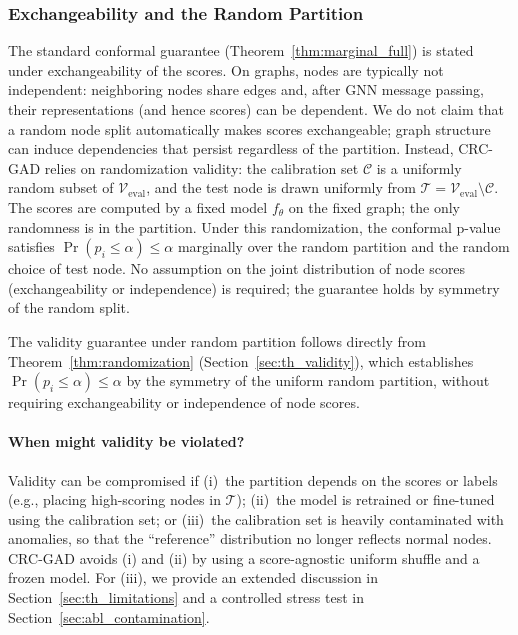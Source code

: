 \documentclass[a4paper]{cas-dc}
\theoremstyle{definition}
\begin{document}
\subsubsection{Exchangeability and the Random Partition}
\label{sec:th_exchangeability}

The standard conformal guarantee (Theorem~\ref{thm:marginal_full}) is stated under exchangeability of the scores.  On graphs, nodes are typically {not} independent: neighboring nodes share edges and, after GNN message passing, their representations (and hence scores) can be dependent.  We do {not} claim that a random node split automatically makes scores exchangeable; graph structure can induce dependencies that persist regardless of the partition. Instead, CRC-GAD relies on {randomization validity}: the calibration set $\mathcal{C}$ is a uniformly random subset of $\mathcal{V}_{\text{eval}}$, and the test node is drawn uniformly from $\mathcal{T} = \mathcal{V}_{\text{eval}} \setminus \mathcal{C}$.  The scores are computed by a {fixed} model $f_\theta$ on the {fixed} graph; the only randomness is in the partition.  Under this randomization, the conformal p-value satisfies $\Pr(p_i \leq \alpha) \leq \alpha$ {marginally} over the random partition and the random choice of test node.  No assumption on the joint distribution of node scores (exchangeability or independence) is required; the guarantee holds by symmetry of the random split.

The validity guarantee under random partition follows directly from Theorem~\ref{thm:randomization} (Section~\ref{sec:th_validity}), which establishes $\Pr(p_i \leq \alpha) \leq \alpha$ by the symmetry of the uniform random partition, without requiring exchangeability or independence of node scores.

\paragraph{When might validity be violated?}
Validity can be compromised if (i)~the partition depends on the scores or labels (e.g., placing high-scoring nodes in $\mathcal{T}$); (ii)~the model is retrained or fine-tuned using the calibration set; or (iii)~the calibration set is heavily contaminated with anomalies, so that the ``reference'' distribution no longer reflects normal nodes.  CRC-GAD avoids (i) and (ii) by using a score-agnostic uniform shuffle and a frozen model.  For (iii), we provide an extended discussion in Section~\ref{sec:th_limitations} and a controlled stress test in Section~\ref{sec:abl_contamination}.
\end{document}
